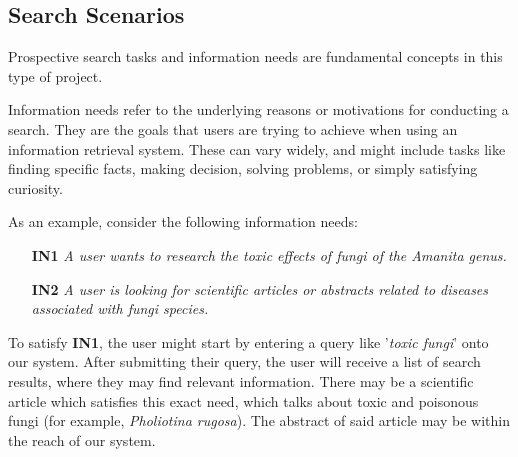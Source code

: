 \subsection{Search Scenarios} \label{search-scenarios}
Prospective search tasks and information needs are fundamental concepts in this type of project.

Information needs refer to the underlying reasons or motivations for conducting a search. They are the goals that users are trying to achieve when using an information retrieval system. These can vary widely, and might include tasks like finding specific facts, making decision, solving problems, or simply satisfying curiosity.

As an example, consider the following information needs:
\begin{itemize}
    \item[\textbf{IN1}] \textit{A user wants to research the toxic effects of fungi of the \textit{Amanita} genus.}
    \item[\textbf{IN2}] \textit{A user is looking for scientific articles or abstracts related to diseases associated with fungi species.}
\end{itemize}

To satisfy \textbf{IN1}, the user might start by entering a query like '\textit{toxic fungi}' onto our system. After submitting their query, the user will receive a list of search results, where they may find relevant information. There may be a scientific article which satisfies this exact need, which talks about toxic and poisonous fungi (for example, \textit{Pholiotina rugosa}). The abstract of said article may be within the reach of our system.
